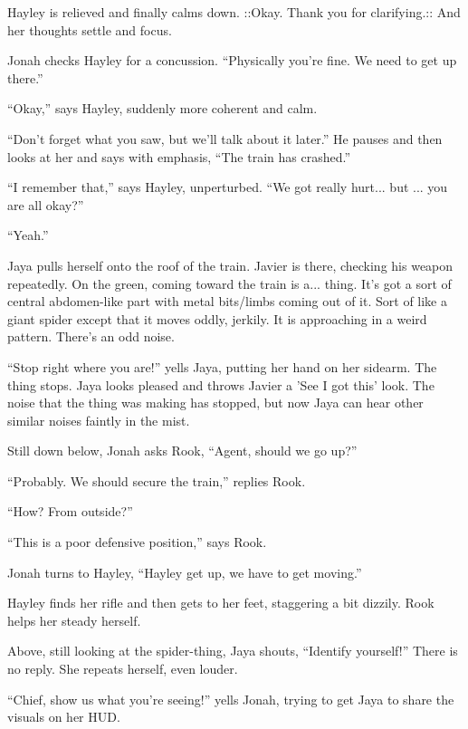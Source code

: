 Hayley is relieved and finally calms down.   {\color[RGB]{255,153,0}::Okay.  Thank you for clarifying.::}   And her thoughts settle and focus.



Jonah checks Hayley for a concussion.  ``Physically you're fine.  We need to get up there.''

``Okay,'' says Hayley, suddenly more coherent and calm.

``Don't forget what you saw, but we'll talk about it later.''  He pauses and then looks at her and says with emphasis, ``The train has crashed.''

``I remember that,'' says Hayley, unperturbed.  ``We got really hurt... but ... you are all okay?''

``Yeah.''





Jaya pulls herself onto the roof of the train.  Javier is there, checking his weapon repeatedly.  On the green, coming toward the train is a... thing.  It's got a sort of central abdomen-like part with metal bits/limbs coming out of it. Sort of like a giant spider except that it moves oddly, jerkily.  It is approaching in a weird pattern.  There's an odd noise.

``Stop right where you are!'' yells Jaya, putting her hand on her sidearm.  The thing stops.  Jaya looks pleased and throws Javier a 'See I got this' look.  The noise that the thing was making has stopped, but now Jaya can hear other similar noises faintly in the mist.



Still down below, Jonah asks Rook, ``Agent, should we go up?''

``Probably.  We should secure the train,'' replies Rook.

``How?  From outside?''

``This is a poor defensive position,'' says Rook.

Jonah turns to Hayley, ``Hayley get up, we have to get moving.''

Hayley finds her rifle and then gets to her feet, staggering a bit dizzily.  Rook helps her steady herself.



Above, still looking at the spider-thing, Jaya shouts, ``Identify yourself!'' There is no reply.  She repeats herself, even louder.

``Chief, show us what you're seeing!'' yells Jonah, trying to get Jaya to share the visuals on her HUD.

